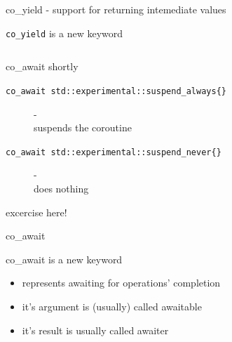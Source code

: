\documentclass[10pt]{beamer}
\newcommand{\code}[1]{\texttt{#1}}
\begin{document}
\begin{frame}[fragile]{co\_yield - support for returning intemediate values}
\centerline{\alert{\code{co\_yield}} is a new keyword}

\begin{columns}

\end{columns}
\end{frame}

\begin{frame}{co\_await shortly}
\begin{description}
  \item[\code{co\_await std::experimental::suspend\_always\{\}}] - \hfill \\ suspends the coroutine
  \item[\code{co\_await std::experimental::suspend\_never\{\}}] - \hfill \\ does nothing
\end{description}

\end{frame}

\begin{frame}{excercise here!}

\end{frame}

\begin{frame}{co\_await}
\centerline{\alert{co\_await} is a new keyword}

\begin{itemize}
  \item represents awaiting for operations' completion
  \item it's argument is (usually) called awaitable
  \item it's result is usually called awaiter
\end{itemize}
\end{frame}
\end{document}
